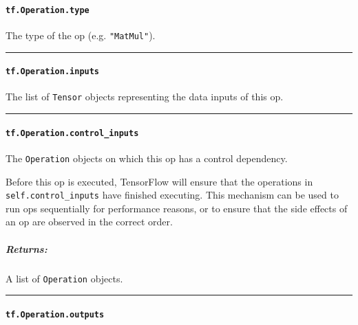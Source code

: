 \paragraph{\texorpdfstring{\lstinline{tf.Operation.type}
}{tf.Operation.type }}\label{tf.operation.type}

The type of the op (e.g. \lstinline{"MatMul"}).

\begin{center}\rule{0.5\linewidth}{\linethickness}\end{center}

\paragraph{\texorpdfstring{\lstinline{tf.Operation.inputs}
}{tf.Operation.inputs }}\label{tf.operation.inputs}

The list of \lstinline{Tensor} objects representing the data inputs of this
op.

\begin{center}\rule{0.5\linewidth}{\linethickness}\end{center}

\paragraph{\texorpdfstring{\lstinline{tf.Operation.control_inputs}
}{tf.Operation.control_inputs }}\label{tf.operation.controlux5finputs}

The \lstinline{Operation} objects on which this op has a control
dependency.

Before this op is executed, TensorFlow will ensure that the operations
in \lstinline{self.control_inputs} have finished executing. This mechanism
can be used to run ops sequentially for performance reasons, or to
ensure that the side effects of an op are observed in the correct order.

\subparagraph{Returns: }\label{returns-14}

A list of \lstinline{Operation} objects.

\begin{center}\rule{0.5\linewidth}{\linethickness}\end{center}

\paragraph{\texorpdfstring{\lstinline{tf.Operation.outputs}
}{tf.Operation.outputs }}\label{tf.operation.outputs}

